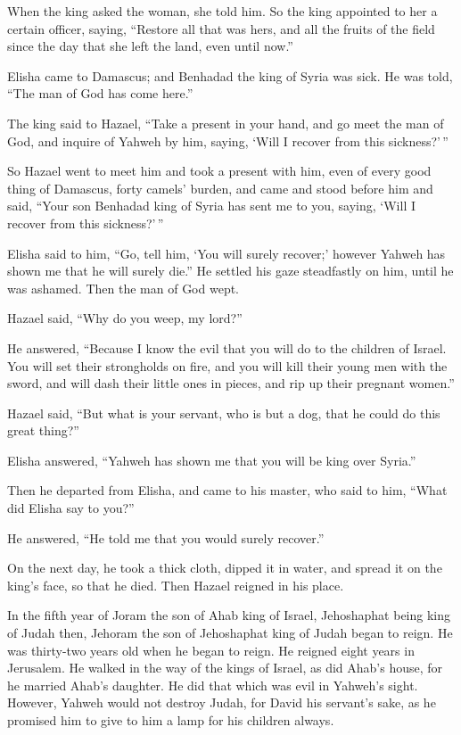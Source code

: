  When the king asked the woman, she told him. So the king
appointed to her a certain officer, saying, ``Restore all that was hers,
and all the fruits of the field since the day that she left the land,
even until now.''

 Elisha came to Damascus; and Benhadad the king of Syria
was sick. He was told, ``The man of God has come here.''

 The king said to Hazael, ``Take a present in your hand,
and go meet the man of God, and inquire of Yahweh by him, saying, `Will
I recover from this sickness?'\,''

 So Hazael went to meet him and took a present with him,
even of every good thing of Damascus, forty camels' burden, and came and
stood before him and said, ``Your son Benhadad king of Syria has sent me
to you, saying, `Will I recover from this sickness?'\,''

 Elisha said to him, ``Go, tell him, `You will surely
recover;' however Yahweh has shown me that he will surely die.''
 He settled his gaze steadfastly on him, until he was
ashamed. Then the man of God wept.

 Hazael said, ``Why do you weep, my lord?''

He answered, ``Because I know the evil that you will do to the children
of Israel. You will set their strongholds on fire, and you will kill
their young men with the sword, and will dash their little ones in
pieces, and rip up their pregnant women.''

 Hazael said, ``But what is your servant, who is but a
dog, that he could do this great thing?''

Elisha answered, ``Yahweh has shown me that you will be king over
Syria.''

 Then he departed from Elisha, and came to his master,
who said to him, ``What did Elisha say to you?''

He answered, ``He told me that you would surely recover.''

 On the next day, he took a thick cloth, dipped it in
water, and spread it on the king's face, so that he died. Then Hazael
reigned in his place.

 In the fifth year of Joram the son of Ahab king of
Israel, Jehoshaphat being king of Judah then, Jehoram the son of
Jehoshaphat king of Judah began to reign.  He was
thirty-two years old when he began to reign. He reigned eight years in
Jerusalem.  He walked in the way of the kings of Israel,
as did Ahab's house, for he married Ahab's daughter. He did that which
was evil in Yahweh's sight.  However, Yahweh would not
destroy Judah, for David his servant's sake, as he promised him to give
to him a lamp for his children always.

